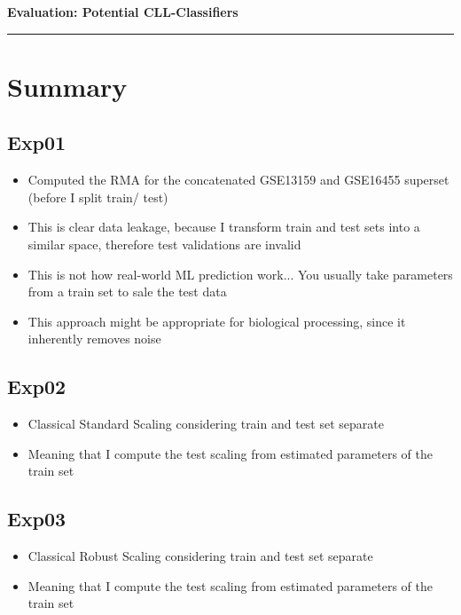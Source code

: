 \documentclass{article}
\begin{document}
	
	\pagestyle{empty}
	\begin{center}
		\LARGE
		\textbf{Evaluation: Potential CLL-Classifiers} \vspace{0.5cm}
		\hrule
	\end{center}
	
	
	\tableofcontents
	\section{Summary}
		\subsection*{Exp01}
			\begin{itemize}
				\item Computed the RMA for the concatenated GSE13159 and GSE16455 superset (before I split train/ test)
				\item This is clear data leakage, because I transform train and test sets into a similar space, therefore test validations are invalid
				\item This is not how real-world ML prediction work... You usually take parameters from a train set to sale the test data
				\item This approach might be appropriate for biological processing, since it inherently removes noise 
			\end{itemize}
		
		\subsection*{Exp02}
			\begin{itemize}
				\item Classical Standard Scaling considering train and test set separate
				\item Meaning that I compute the test scaling from estimated parameters of the train set
			\end{itemize}
		
		\subsection*{Exp03}
			\begin{itemize}
				\item Classical Robust Scaling considering train and test set separate
				\item Meaning that I compute the test scaling from estimated parameters of the train set
			\end{itemize}
		
\end{document}
